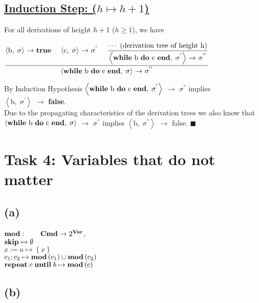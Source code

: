 \documentclass[12pt]{scrartcl}
\newcommand{\eRelation}[2]{$\dfrac{\text{#1}}{\text{#2}}$}
\newcommand{\eState}[2]{$\left\langle \text{#1},\; \text{#2}\right\rangle$}
\newcommand{\eRule}[3]{\eState{#1}{#2} $\rightarrow$ #3}
\begin{document}
		\subsection*{\underline{Induction Step: ({\boldmath$h\mapsto h+1$})}}
		\indent\indent For all derivations of height $h+1$ ($h\geq 1$), we have\\
		\begin{center}
			\eRelation
				{\eRule{b}{$\sigma$}{\textbf{true}} \quad \eRule{c}{$\sigma$}{$\sigma ^{'}$} \quad \eRelation{$\cdots$ (derivation tree of height h)}{\eRule{\textbf{while} b \textbf{do} c \textbf{end}}{$\sigma ^{'}$}{$\sigma ^{''}$}}}
				{\eRule{\textbf{while} b \textbf{do} c \textbf{end}}{$\sigma$}{$\sigma ^{''}$}}
		\end{center}
		\indent\indent By Induction Hypothesis \eRule{\textbf{while} b \textbf{do} c \textbf{end}}{$\sigma ^{'}$}{$\sigma ^{''}$} implies\\\indent \eRule{b}{$\sigma ^{'}$}{\textbf{false}}.\\
		\indent Due to the propagating characteristics of the derivation trees we also know \indent that \eRule{\textbf{while} b \textbf{do} c \textbf{end}}{$\sigma$}{$\sigma ^{''}$} implies \eRule{b}{$\sigma ^{''}$}{false}. \qquad $\blacksquare$
	\section*{Task 4: Variables that do not matter}
	
	\subsection*{(a)}
	
	\indent\indent $\text{\textbf{mod}}: \qquad \text{\textbf{Cmd}}\rightarrow 2^{\text{\textbf{Var}}}$,\\
	\indent $\text{\textbf{skip}}\mapsto\emptyset$\\
	\indent $x:=a\mapsto \left\lbrace x \right\rbrace$\\
	\indent $c_1;c_2\mapsto \text{\textbf{mod}}\left( c_1\right) \cup\text{\textbf{mod}}\left( c_2\right)$\\
	\indent $\text{\textbf{repeat}}\; c\; \text{\textbf{until}}\; b \mapsto \text{\textbf{mod}}\left( c\right)$\\
	
	\subsection*{(b)}
	
\end{document}
